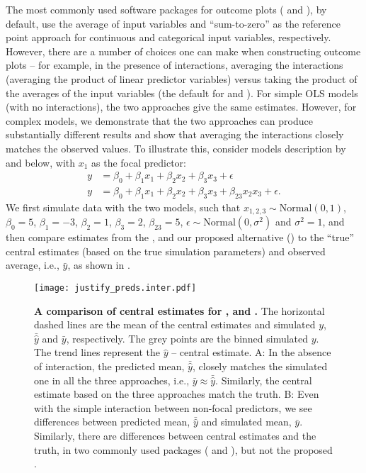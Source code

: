 The most commonly used  software packages for outcome plots ( and ), by default, use the average of input variables and ``sum-to-zero'' as the reference point approach for continuous and categorical input variables, respectively. However, there are a number of choices one can make when constructing outcome plots -- for example, in the presence of interactions, averaging the interactions (averaging the product of linear predictor variables) versus taking the product of the averages of the input variables (the default for  and ). For simple OLS models (with no interactions), the two approaches give the same estimates. However, for complex models, we demonstrate that the two approaches can produce substantially different results and show that averaging the interactions closely matches the observed values. To illustrate this, consider models description by  and  below, with $x_1$ as the focal predictor:
%
\begin{align}
y &= \beta_0 + \beta_1x_1 + \beta_2x_2 + \beta_3x_3 + \epsilon \label{eq:simple_inter_higher_no_interaction}\\
y &= \beta_0 + \beta_1x_1 + \beta_2x_2 + \beta_3x_3 + \beta_{23}x_2x_3 + \epsilon \label{eq:simple_inter_higher}.
\end{align}
%
We first simulate data with the two models, such that $x_{1,2,3} \sim \mathrm{Normal}(0, 1)$, $\beta_0 = 5$, $\beta_1 = -3$, $\beta_2 = 1$, $\beta_3 = 2$, $\beta_{23} = 5$, $\epsilon \sim \mathrm{Normal}(0, \sigma^2)$ and $\sigma^2 = 1$, and then compare estimates from the ,  and our proposed alternative () to the ``true'' central estimates (based on the true simulation parameters) and observed average, i.e., $\bar{y}$, as shown in .
%
\begin{figure}
\begin{center}
\texttt{[image: justify\_preds.inter.pdf]}
\end{center}
\caption{{\bf A comparison of central estimates for ,  and .} The horizontal dashed lines are the mean of the central estimates and simulated $y$, $\bar{\hat{y}}$ and $\bar{y}$, respectively. The grey points are the binned simulated $y$. The trend lines represent the $\hat{y}$ -- central estimate. A: In the absence of interaction, the predicted mean, $\bar{\hat{y}}$, closely matches the simulated one in all the three approaches, i.e., $\bar{y} \approx \bar{\hat{y}}$. Similarly, the central estimate based on the three approaches match the truth. B: Even with the simple interaction between non-focal predictors, we see differences between predicted mean, $\bar{\hat{y}}$ and simulated mean, $\bar{y}$. Similarly, there are differences between central estimates and the truth, in two commonly used packages ( and ), but not the proposed .}
\label{fig:justify_plots}
\end{figure}
